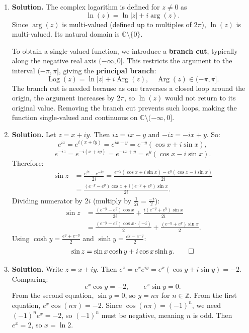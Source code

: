 \begin{enumerate}
\item \textbf{Solution.}
The complex logarithm is defined for $z \neq 0$ as
\[
\ln(z) = \ln|z| + i\arg(z).
\]
Since $\arg(z)$ is multi-valued (defined up to multiples of $2\pi$), $\ln(z)$ is multi-valued. Its natural domain is $\mathbb{C} \setminus \{0\}$.

To obtain a single-valued function, we introduce a \textbf{branch cut}, typically along the negative real axis $(-\infty, 0]$. This restricts the argument to the interval $(-\pi, \pi]$, giving the \textbf{principal branch}:
\[
\operatorname{Log}(z) = \ln|z| + i\operatorname{Arg}(z), \quad \operatorname{Arg}(z) \in (-\pi, \pi].
\]
The branch cut is needed because as one traverses a closed loop around the origin, the argument increases by $2\pi$, so $\ln(z)$ would not return to its original value. Removing the branch cut prevents such loops, making the function single-valued and continuous on $\mathbb{C} \setminus (-\infty, 0]$.

\item \textbf{Solution.}
Let $z = x + iy$. Then $iz = ix - y$ and $-iz = -ix + y$. So:
\[
e^{iz} = e^{i(x+iy)} = e^{ix - y} = e^{-y}(\cos x + i\sin x),
\]
\[
e^{-iz} = e^{-i(x+iy)} = e^{-ix + y} = e^{y}(\cos x - i\sin x).
\]
Therefore:
\begin{align*}
\sin z &= \frac{e^{iz} - e^{-iz}}{2i} = \frac{e^{-y}(\cos x + i\sin x) - e^y(\cos x - i\sin x)}{2i} \\
&= \frac{(e^{-y} - e^y)\cos x + i(e^{-y} + e^y)\sin x}{2i}.
\end{align*}
Dividing numerator by $2i$ (multiply by $\frac{1}{2i} = \frac{-i}{2}$):
\begin{align*}
\sin z &= \frac{(e^{-y} - e^y)\cos x}{2i} + \frac{i(e^{-y} + e^y)\sin x}{2i} \\
&= \frac{(e^{-y} - e^y)\cos x \cdot (-i)}{2} + \frac{(e^{-y} + e^y)\sin x}{2}.
\end{align*}
Using $\cosh y = \frac{e^y + e^{-y}}{2}$ and $\sinh y = \frac{e^y - e^{-y}}{2}$:
\[
\sin z = \sin x \cosh y + i\cos x \sinh y. \qed
\]

\item \textbf{Solution.}
Write $z = x + iy$. Then $e^z = e^x e^{iy} = e^x(\cos y + i\sin y) = -2$. Comparing:
\[
e^x \cos y = -2, \qquad e^x \sin y = 0.
\]
From the second equation, $\sin y = 0$, so $y = n\pi$ for $n \in \mathbb{Z}$. From the first equation, $e^x \cos(n\pi) = -2$. Since $\cos(n\pi) = (-1)^n$, we need $(-1)^n e^x = -2$, so $(-1)^n$ must be negative, meaning $n$ is odd. Then $e^x = 2$, so $x = \ln 2$.


\end{enumerate}
